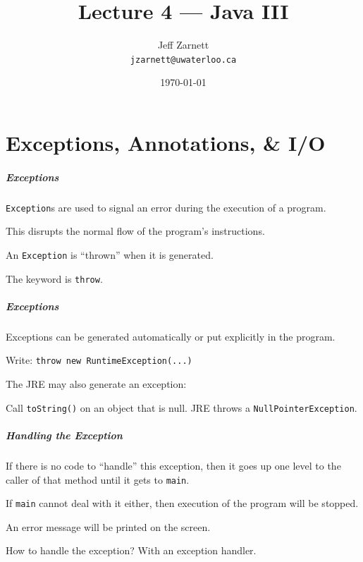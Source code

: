 


\title{Lecture 4 --- Java III}

\author{Jeff Zarnett \\ \small \texttt{jzarnett@uwaterloo.ca}}
\date{\today}





\begin{frame}
  \titlepage
\end{frame}

\part{Exceptions, Annotations, \& I/O}
\frame{\partpage}

\begin{frame}
\frametitle{Exceptions}
\begin{changemargin}{1cm}

\texttt{Exception}s are used to signal an error during the execution of a program.

This disrupts the normal flow of the program's instructions.

An \texttt{Exception} is ``thrown'' when it is generated.

The keyword is \texttt{throw}.

\end{changemargin}
\end{frame}

\begin{frame}
\frametitle{Exceptions}
\begin{changemargin}{1cm}

Exceptions can be generated automatically or put explicitly in the program.

Write: \texttt{throw new RuntimeException(...)}

The JRE may also generate an exception:

Call \texttt{toString()} on an object that is null. JRE throws a \texttt{NullPointerException}.


\end{changemargin}
\end{frame}

\begin{frame}
\frametitle{Handling the Exception}
\begin{changemargin}{1cm}

If there is no code to ``handle'' this exception, then it goes up one level to the caller of that method until it gets to \texttt{main}. 

If \texttt{main} cannot deal with it either, then execution of the program will be stopped.

An error message will be printed on the screen. 

How to handle the exception? With an exception handler. 

\end{changemargin}
\end{frame}

